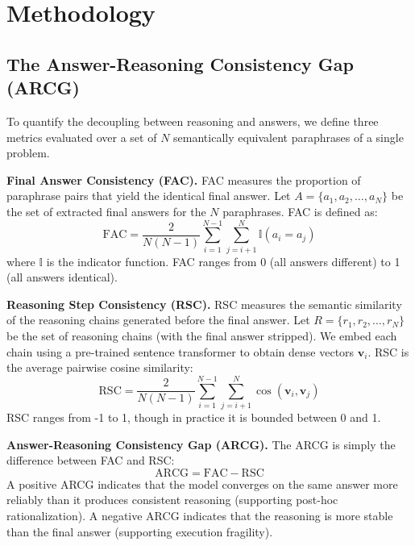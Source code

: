 \documentclass{article} %
\begin{document}
\section{Methodology}

\subsection{The Answer-Reasoning Consistency Gap (ARCG)}

To quantify the decoupling between reasoning and answers, we define three metrics evaluated over a set of $N$ semantically equivalent paraphrases of a single problem.

\textbf{Final Answer Consistency (FAC).} FAC measures the proportion of paraphrase pairs that yield the identical final answer. Let $A = \{a_1, a_2, \dots, a_N\}$ be the set of extracted final answers for the $N$ paraphrases. FAC is defined as:
\begin{equation}
\text{FAC} = \frac{2}{N(N-1)} \sum_{i=1}^{N-1} \sum_{j=i+1}^{N} \mathbb{I}(a_i = a_j)
\end{equation}
where $\mathbb{I}$ is the indicator function. FAC ranges from 0 (all answers different) to 1 (all answers identical).

\textbf{Reasoning Step Consistency (RSC).} RSC measures the semantic similarity of the reasoning chains generated before the final answer. Let $R = \{r_1, r_2, \dots, r_N\}$ be the set of reasoning chains (with the final answer stripped). We embed each chain using a pre-trained sentence transformer \citep{reimers-gurevych-2019-sentence} to obtain dense vectors $\mathbf{v}_i$. RSC is the average pairwise cosine similarity:
\begin{equation}
\text{RSC} = \frac{2}{N(N-1)} \sum_{i=1}^{N-1} \sum_{j=i+1}^{N} \cos(\mathbf{v}_i, \mathbf{v}_j)
\end{equation}
RSC ranges from -1 to 1, though in practice it is bounded between 0 and 1.

\textbf{Answer-Reasoning Consistency Gap (ARCG).} The ARCG is simply the difference between FAC and RSC:
\begin{equation}
\text{ARCG} = \text{FAC} - \text{RSC}
\end{equation}
A positive ARCG indicates that the model converges on the same answer more reliably than it produces consistent reasoning (supporting post-hoc rationalization). A negative ARCG indicates that the reasoning is more stable than the final answer (supporting execution fragility).
\end{document}
